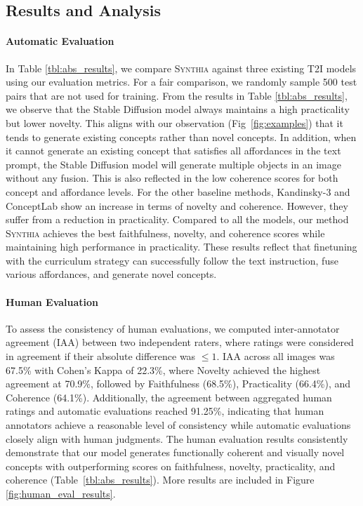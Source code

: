 



\subsection{Results and Analysis}
\paragraph{Automatic Evaluation}
In Table \ref{tbl:abs_results}, we compare \textsc{Synthia} against three existing T2I models using our evaluation metrics. For a fair comparison, we randomly sample 500 test pairs that are not used for training.
From the results in Table \ref{tbl:abs_results}, we observe that the Stable Diffusion model always maintains a high practicality but lower novelty. This aligns with our observation (Fig~\ref{fig:examples}) that it tends to generate existing concepts rather than novel concepts. In addition, when it cannot generate an existing concept that satisfies all affordances in the text prompt, the Stable Diffusion model will generate multiple objects in an image without any fusion. This is also reflected in the low coherence scores for both concept and affordance levels. For the other baseline methods, Kandinsky-3 and ConceptLab show an increase in terms of novelty and coherence. However, they suffer from a reduction in practicality. Compared to all the models, our method \textsc{Synthia} achieves the best faithfulness, novelty, and coherence scores while maintaining high performance in practicality. These results reflect that finetuning with the curriculum strategy can successfully follow the text instruction, fuse various affordances, and generate novel concepts.
\paragraph{Human Evaluation}
To assess the consistency of human evaluations, we computed inter-annotator agreement (IAA) between two independent raters, where ratings were considered in agreement if their absolute difference was $\leq 1$. IAA across all images was 67.5\% with Cohen's Kappa of 22.3\%, where Novelty achieved the highest agreement at 70.9\%, followed by Faithfulness (68.5\%), Practicality (66.4\%), and Coherence (64.1\%). Additionally, the agreement between aggregated human ratings and automatic evaluations reached 91.25\%, indicating that human annotators achieve a reasonable level of consistency while automatic evaluations closely align with human judgments. The human evaluation results consistently demonstrate that our model generates functionally coherent and visually novel concepts with outperforming scores on faithfulness, novelty, practicality, and coherence (Table~\ref{tbl:abs_results}). More results are included in Figure \ref{fig:human_eval_results}.

